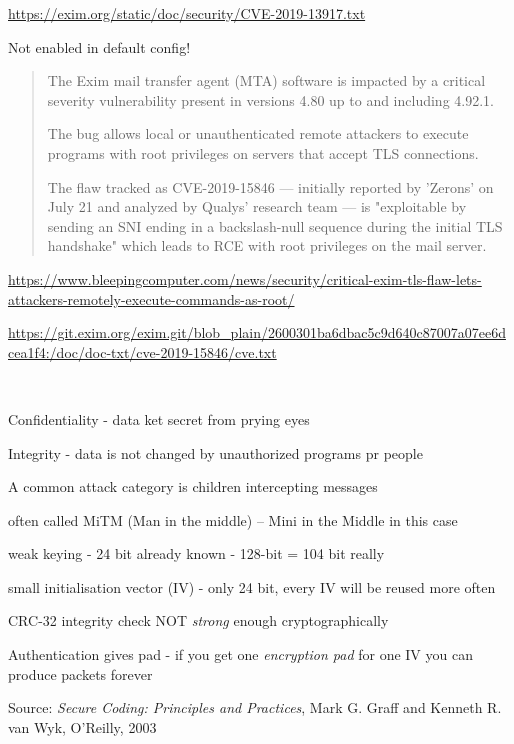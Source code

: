 \documentclass[Screen16to9,17pt]{foils}
\begin{document}
\url{https://exim.org/static/doc/security/CVE-2019-13917.txt}

Not enabled in default config!


\begin{quote}
The Exim mail transfer agent (MTA) software is impacted by a critical severity vulnerability present in versions 4.80 up to and including 4.92.1.

The bug allows local or unauthenticated remote attackers to execute programs with root privileges on servers that accept TLS connections.

The flaw tracked as CVE-2019-15846 — initially reported by 'Zerons' on July 21 and analyzed by Qualys' research team — is "exploitable by sending an SNI ending in a backslash-null sequence during the initial TLS handshake" which leads to RCE with root privileges on the mail server.
\end{quote}

\url{https://www.bleepingcomputer.com/news/security/critical-exim-tls-flaw-lets-attackers-remotely-execute-commands-as-root/}


\url{https://git.exim.org/exim.git/blob_plain/2600301ba6dbac5c9d640c87007a07ee6dcea1f4:/doc/doc-txt/cve-2019-15846/cve.txt}






{~}

\begin{list2}
\item Confidentiality - data ket secret from prying eyes
\item Integrity - data is not changed by unauthorized programs pr people
\item A common attack category is children intercepting messages
\item often called MiTM (Man in the middle) -- Mini in the Middle in this case
\end{list2}





\begin{list1}
\item weak keying - 24 bit already known - 128-bit = 104 bit really
\item small initialisation vector (IV) - only 24 bit, every IV will be reused more often
\item CRC-32 integrity check NOT \emph{strong} enough cryptographically
\item Authentication gives pad - if you get one \emph{encryption pad} for one IV you can produce packets forever
\end{list1}
Source:
\emph{Secure Coding: Principles and Practices}, Mark G. Graff
and Kenneth R. van Wyk, O'Reilly, 2003
\end{document}
